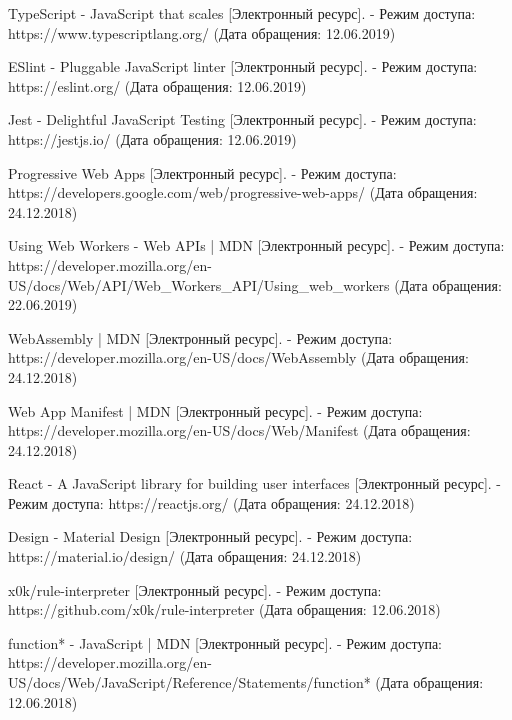 \begingroup
\renewcommand{\section}[2]{\anonsection{Библиографический список}}
\begin{thebibliography}{00}

  TypeScript - JavaScript that scales
  [Электронный ресурс]. - Режим доступа: https://www.typescriptlang.org/
  (Дата обращения: 12.06.2019)

  ESlint - Pluggable JavaScript linter
  [Электронный ресурс]. - Режим доступа: https://eslint.org/
  (Дата обращения: 12.06.2019)

  Jest - Delightful JavaScript Testing
  [Электронный ресурс]. - Режим доступа: https://jestjs.io/
  (Дата обращения: 12.06.2019)

  Progressive Web Apps
  [Электронный ресурс]. - Режим доступа: https://developers.google.com/web/progressive-web-apps/
  (Дата обращения: 24.12.2018)

  Using Web Workers - Web APIs | MDN
  [Электронный ресурс]. - Режим доступа: https://developer.mozilla.org/en-US/docs/Web/API/Web\_Workers\_API/Using\_web\_workers
  (Дата обращения: 22.06.2019)

  WebAssembly | MDN
  [Электронный ресурс]. - Режим доступа: https://developer.mozilla.org/en-US/docs/WebAssembly
  (Дата обращения: 24.12.2018)

  Web App Manifest | MDN
  [Электронный ресурс]. - Режим доступа: https://developer.mozilla.org/en-US/docs/Web/Manifest
  (Дата обращения: 24.12.2018)

  React - A JavaScript library for building user interfaces
  [Электронный ресурс]. - Режим доступа: https://reactjs.org/
  (Дата обращения: 24.12.2018)

  Design - Material Design
  [Электронный ресурс]. - Режим доступа: https://material.io/design/
  (Дата обращения: 24.12.2018)

  x0k/rule-interpreter
  [Электронный ресурс]. - Режим доступа: https://github.com/x0k/rule-interpreter
  (Дата обращения: 12.06.2018)

  function* - JavaScript | MDN
  [Электронный ресурс]. - Режим доступа: https://developer.mozilla.org/en-US/docs/Web/JavaScript/Reference/Statements/function*
  (Дата обращения: 12.06.2018)


\end{thebibliography}
